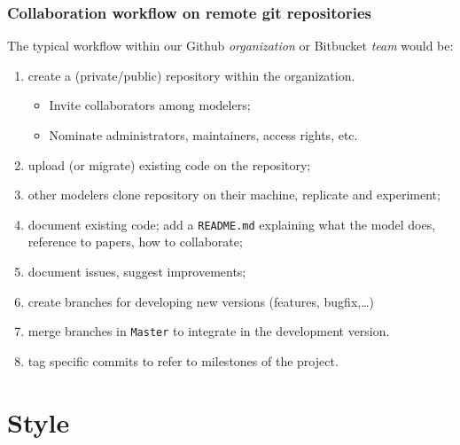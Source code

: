 \documentclass[10pt,svgnames,handout]{beamer}
\begin{document}
\begin{frame}
\frametitle{Collaboration workflow on remote git repositories}
The typical workflow within our Github \emph{organization} or Bitbucket \emph{team} would be:
\begin{enumerate}[<+->]
  \item create a (private/public) repository within the organization.
  \begin{itemize}
    \item Invite collaborators among modelers;
    \item Nominate administrators, maintainers, access rights, etc.
  \end{itemize}
  \item upload (or migrate) existing code on the repository;
  \item other modelers clone repository on their machine, replicate and experiment;
  \item document existing code; add a \texttt{README.md} explaining what the model does, reference to papers, how to collaborate;
  \item document issues, suggest improvements;
  \item create branches for developing new versions (features, bugfix,\ldots)
  \item merge branches in \texttt{Master} to integrate in the development version.
  \item tag specific commits to refer to milestones of the project.
\end{enumerate}

\end{frame}



\section{Style}
\end{document}

